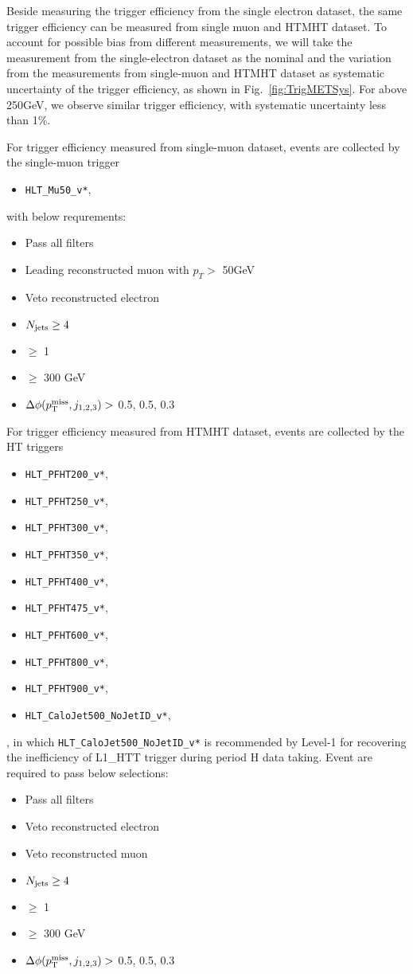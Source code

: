 Beside measuring the \MET trigger efficiency from the single electron dataset,
the same trigger efficiency can be measured from single muon and HTMHT
dataset. To account for possible bias from different measurements, we will
take the measurement from the single-electron dataset as the nominal and the
variation from the measurements from single-muon and HTMHT dataset as
systematic uncertainty of the trigger efficiency, as shown in
Fig.~\ref{fig:TrigMETSys}. For \MET above 250GeV, we observe similar \MET
trigger efficiency, with systematic uncertainty less than 1\%.

For \MET trigger efficiency measured from single-muon dataset, events are
collected by the single-muon trigger
\begin{itemize}
  \item \texttt{HLT\_Mu50\_v*},
\end{itemize}
with below requrements:
\begin{itemize}
  \item Pass all filters
	\item Leading reconstructed muon with $p_{T}>$ 50GeV
  \item Veto reconstructed electron
  \item $N_{\text{jets}}\geq4$
  \item \nbjets $\ge$ 1
  \item \HT $\ge$ 300 GeV
  \item $\Delta\phi(p^{\rm miss}_{\rm T}, j_{1,2,3})>$ 0.5, 0.5, 0.3
\end{itemize}
For \MET trigger efficiency measured from HTMHT dataset, events are
collected by the HT triggers
\begin{itemize}
  \item \texttt{HLT\_PFHT200\_v*},
  \item \texttt{HLT\_PFHT250\_v*},
  \item \texttt{HLT\_PFHT300\_v*},
  \item \texttt{HLT\_PFHT350\_v*},
  \item \texttt{HLT\_PFHT400\_v*},
  \item \texttt{HLT\_PFHT475\_v*},
  \item \texttt{HLT\_PFHT600\_v*},
  \item \texttt{HLT\_PFHT800\_v*},
  \item \texttt{HLT\_PFHT900\_v*},
  \item \texttt{HLT\_CaloJet500\_NoJetID\_v*},
\end{itemize}, 
in which \texttt{HLT\_CaloJet500\_NoJetID\_v*} is recommended by Level-1 for
recovering the inefficiency of L1\_HTT trigger during period H data taking.
Event are required to pass below selections:
\begin{itemize}
  \item Pass all filters
  \item Veto reconstructed electron
  \item Veto reconstructed muon
  \item $N_{\text{jets}}\geq4$
  \item \nbjets $\ge$ 1
  \item \HT $\ge$ 300 GeV
  \item $\Delta\phi(p^{\rm miss}_{\rm T}, j_{1,2,3})>$ 0.5, 0.5, 0.3
\end{itemize}


